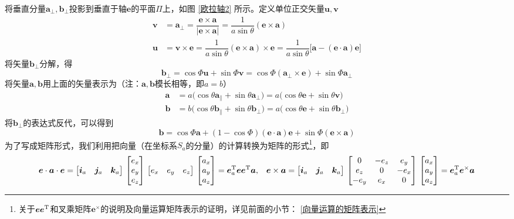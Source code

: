 将垂直分量$\bm{a}_{\perp}, \bm{b}_{\perp}$投影到垂直于轴$\bm{e}$的平面$\Pi$上，如图 \ref{欧拉轴2} 所示。定义单位正交矢量$\bm{u}, \bm{v}$
\begin{align*}
	\bm{v} & = \bm{a}_{\perp} = \dfrac{\bm{e} \times \bm{a}}{\big| \bm{e} \times \bm{a} \big|} = \dfrac{1}{a \sin \theta}(\bm{e} \times \bm{a}) \\
	\bm{u} & = \bm{v} \times \bm{e} = \dfrac{1}{a \sin \theta} (\bm{e} \times \bm{a}) \times \bm{e} = \dfrac{1}{a \sin \theta}\big[ \bm{a} - (\bm{e} \cdot \bm{a})\bm{e} \big] 
\end{align*}
将矢量$\bm{b}_{\perp}$分解，得
\begin{equation*}
	\bm{b}_{\perp} = \cos \varPhi \bm{u} + \sin \varPhi \bm{v} = \cos \varPhi (\bm{a}_\perp \times \bm{e}) + \sin \varPhi \bm{a}_\perp
\end{equation*}
将矢量$\bm{a}, \bm{b}$用上面的矢量表示为（注：$\bm{a}, \bm{b}$模长相等，即$a=b$）
\begin{align}
	\bm{a} & = a \big( \cos \theta \bm{a}_{\parallel} + \sin \theta \bm{a}_{\perp} \big) 
	= a \big( \cos \theta \bm{e} + \sin \theta \bm{v} \big) \\
	\bm{b} & = b \big( \cos \theta \bm{b}_{\parallel} + \sin \theta \bm{b}_{\perp} \big) 
	= a \big( \cos \theta \bm{e} + \sin \theta \bm{b}_{\perp} \big)
\end{align}
将$\bm{b}_{\perp}$的表达式反代，可以得到
\begin{equation}
	\bm{b} = \cos \varPhi \bm{a} + ( 1 - \cos \varPhi ) (\bm{e} \cdot \bm{a})\bm{e} + \sin \varPhi(\bm{e} \times \bm{a})
\end{equation}
为了写成矩阵形式，我们利用把向量（在坐标系$S_a$的分量）的计算转换为矩阵的形式\footnote[1]{关于$\bm{e}\bm{e}^{\text{T}}$和叉乘矩阵$\bm{e}^\times$的说明及向量运算矩阵表示的证明，详见前面的小节： \ref{向量运算的矩阵表示} \link[向量运算的矩阵表示]}，即
\begin{align*}
	\bm{e} \cdot \bm{a} \cdot \bm{e} = 
	\big[ \bm{i}_a \quad \bm{j}_a \quad \bm{k}_a \big] \,
	\begin{bmatrix}
		e_x \\
		e_y \\
		e_z
	\end{bmatrix}
	\,
	\big[ e_x \quad e_y \quad e_z \big]
	\,
	\begin{bmatrix}
		a_x \\
		a_y \\
		a_z
	\end{bmatrix}
	= \bm{e}_a^{\text{T}} \bm{e} \bm{e}^\text{T} \bm{a},
	&& \bm{e} \times \bm{a} =
	\big[ \bm{i}_a \quad \bm{j}_a \quad \bm{k}_a \big] \,
	\begin{bmatrix}
		0 & -e_z & e_y \\
		e_z & 0 & -e_x \\
		-e_y & e_x & 0
	\end{bmatrix}
	\,
	\begin{bmatrix}
		a_x \\
		a_y \\
		a_z
	\end{bmatrix}
	= \bm{e}_a^{\text{T}} \bm{e}^\times \bm{a}
\end{align*}
